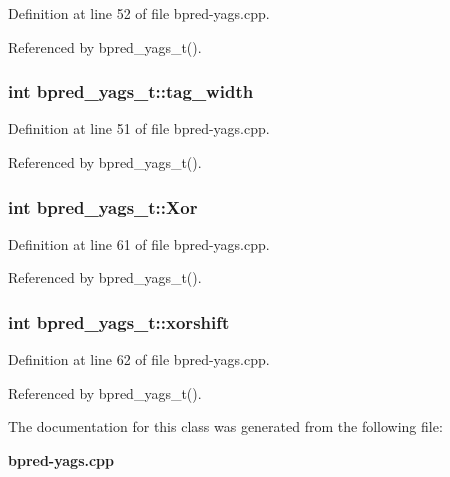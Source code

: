 Definition at line 52 of file bpred-yags.cpp.

Referenced by bpred\_\-yags\_\-t().
\subsubsection[{tag\_\-width}]{\setlength{\rightskip}{0pt plus 5cm}int {\bf bpred\_\-yags\_\-t::tag\_\-width}\hspace{0.3cm}{\tt  [protected]}}\label{classbpred__yags__t_92279c5c0cedea524b6dc2724b20f217}




Definition at line 51 of file bpred-yags.cpp.

Referenced by bpred\_\-yags\_\-t().
\subsubsection[{Xor}]{\setlength{\rightskip}{0pt plus 5cm}int {\bf bpred\_\-yags\_\-t::Xor}\hspace{0.3cm}{\tt  [protected]}}\label{classbpred__yags__t_6fe9fc02c9b815ce706c21c118ac6b3a}




Definition at line 61 of file bpred-yags.cpp.

Referenced by bpred\_\-yags\_\-t().
\subsubsection[{xorshift}]{\setlength{\rightskip}{0pt plus 5cm}int {\bf bpred\_\-yags\_\-t::xorshift}\hspace{0.3cm}{\tt  [protected]}}\label{classbpred__yags__t_d352f9462bed78b22b2ddfb611f1b4f5}




Definition at line 62 of file bpred-yags.cpp.

Referenced by bpred\_\-yags\_\-t().

The documentation for this class was generated from the following file:\begin{CompactItemize}
\item 
{\bf bpred-yags.cpp}\end{CompactItemize}
